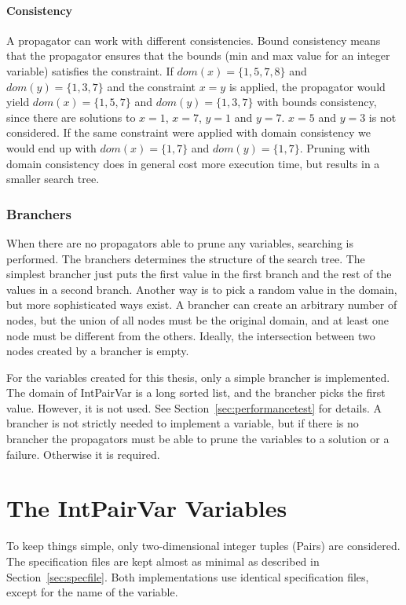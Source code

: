 \documentclass[a4paper,11pt]{article}
\begin{document}
\paragraph{Consistency}
A propagator can work with different consistencies. Bound consistency means that the propagator ensures that the bounds (min and max value for an integer variable) satisfies the constraint. If $dom(x)=\{1,5,7,8\}$ and $dom(y)=\{1,3,7\}$ and the constraint $x=y$ is applied, the propagator would yield $dom(x)=\{1,5,7\}$ and $dom(y)=\{1,3,7\}$ with bounds consistency, since there are solutions to $x=1$, $x=7$, $y=1$ and $y=7$. $x=5$ and $y=3$ is not considered. If the same constraint were applied with domain consistency we would end up with $dom(x)=\{1,7\}$ and $dom(y)=\{1,7\}$. Pruning with domain consistency does in general cost more execution time, but results in a smaller search tree.

\subsubsection{Branchers}
When there are no propagators able to prune any variables, searching is performed. The branchers determines the structure of the search tree. The simplest brancher just puts the first value in the first branch and the rest of the values in a second branch. Another way is to pick a random value in the domain, but more sophisticated ways exist. A brancher can create an arbitrary number of nodes, but the union of all nodes must be the original domain, and at least one node must be different from the others. Ideally, the intersection between two nodes created by a brancher is empty.

For the variables created for this thesis, only a simple brancher is implemented. The domain of IntPairVar is a long sorted list, and the brancher picks the first value. However, it is not used. See Section~\ref{sec:performancetest} for details. A brancher is not strictly needed to implement a variable, but if there is no brancher the propagators must be able to prune the variables to a solution or a failure. Otherwise it is required. 

\section{The IntPairVar Variables}
To keep things simple, only two-dimensional integer tuples (Pairs) are considered. The specification files are kept almost as minimal as described in Section~\ref{sec:specfile}. Both implementations use identical specification files, except for the name of the variable. 
\end{document}
